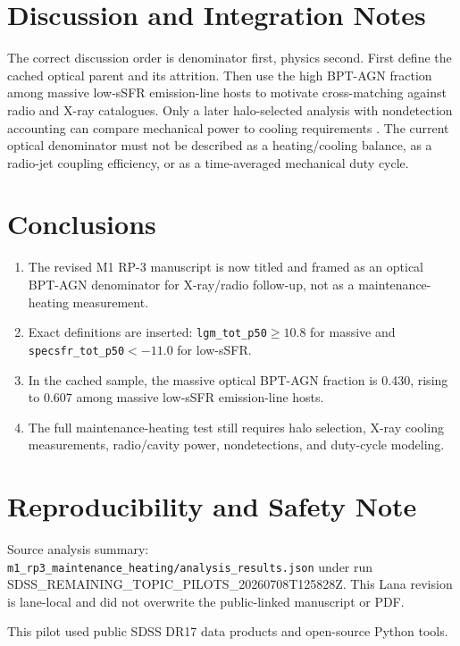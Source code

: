 \documentclass[twocolumn]{aastex631}
\begin{document}
\section{Discussion and Integration Notes}\label{sec:discussion}
The correct discussion order is denominator first, physics second.  First define the cached optical parent and its attrition.  Then use the high BPT-AGN fraction among massive low-sSFR emission-line hosts to motivate cross-matching against radio and X-ray catalogues.  Only a later halo-selected analysis with nondetection accounting can compare mechanical power to cooling requirements \citep{mcnamara2007,mcnamara2012,eckert2024}.  The current optical denominator must not be described as a heating/cooling balance, as a radio-jet coupling efficiency, or as a time-averaged mechanical duty cycle.

\section{Conclusions}\label{sec:conclusions}
\begin{enumerate}
\item The revised M1 RP-3 manuscript is now titled and framed as an optical BPT-AGN denominator for X-ray/radio follow-up, not as a maintenance-heating measurement.
\item Exact definitions are inserted: \texttt{lgm\_tot\_p50}$\geq10.8$ for massive and \texttt{specsfr\_tot\_p50}$<-11.0$ for low-sSFR.
\item In the cached sample, the massive optical BPT-AGN fraction is 0.430, rising to 0.607 among massive low-sSFR emission-line hosts.
\item The full maintenance-heating test still requires halo selection, X-ray cooling measurements, radio/cavity power, nondetections, and duty-cycle modeling.
\end{enumerate}

\section*{Reproducibility and Safety Note}
Source analysis summary: \texttt{m1\_rp3\_maintenance\_heating/analysis\_results.json} under run SDSS\_REMAINING\_TOPIC\_PILOTS\_20260708T125828Z.  This Lana revision is lane-local and did not overwrite the public-linked manuscript or PDF.

\acknowledgments
This pilot used public SDSS DR17 data products and open-source Python tools.
\end{document}

